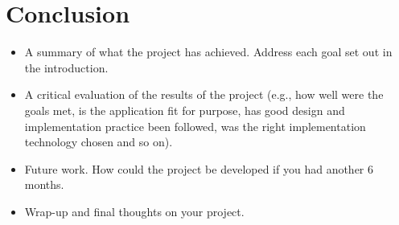 \section{Conclusion}
\label{sec:conc}

\begin{itemize}
	\item A summary of what the project has achieved. Address each goal set out in the introduction.
	\item A critical evaluation of the results of the project (e.g., how well were the goals met, is the application fit for purpose, has good design and implementation practice been followed, was the right implementation technology chosen and so on).
	\item Future work. How could the project be developed if you had another 6 months.
	\item Wrap-up and final thoughts on your project.
\end{itemize}